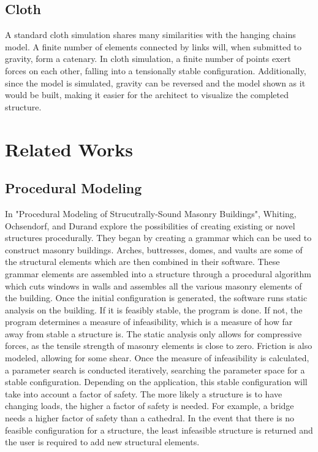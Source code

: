 \documentclass{thesis}
\begin{document}
\subsection{Cloth}
A standard cloth simulation shares many similarities with the hanging chains model.  A finite number of elements connected by links will, when
submitted to gravity, form a catenary.  In cloth simulation, a finite number of points exert forces on each other, falling into a tensionally stable
configuration.  Additionally, since the model is simulated, gravity can be reversed and the model shown as it would be built, making it easier for
the architect to visualize the completed structure.

\section{Related Works}
\subsection{Procedural Modeling}
In "Procedural Modeling of Strucutrally-Sound Masonry Buildings"\cite{whiting:2009}, Whiting, Ochsendorf, and Durand explore
the possibilities of creating existing or novel structures procedurally.  They began by creating a grammar
which can be used to construct masonry buildings.  Arches, buttresses, domes, and vaults are some of the
structural elements which are then combined in their software.  These grammar elements are assembled into
a structure through a procedural algorithm which cuts windows in walls and assembles
all the various masonry elements of the building.  Once the initial configuration is
generated, the software runs static analysis on the building.  If it is feasibly stable, the program is
done.  If not, the program determines a measure of infeasibility, which is a measure of how far away from
stable a structure is.  The static analysis only allows for compressive forces, as the tensile strength of
masonry elements is close to zero.  Friction is also modeled, allowing for some shear.  Once the measure
of infeasibility is calculated, a parameter search is conducted iteratively, searching the parameter space
for a stable configuration.  Depending on the application, this stable configuration will take into account
a factor of safety.  The more likely a structure is to have changing loads, the higher a factor of
safety is needed.  For example, a bridge needs a higher factor of safety than a cathedral.  In the event
that there is no feasible configuration for a structure, the least infeasible structure is returned and the
user is required to add new structural elements.
\end{document}
